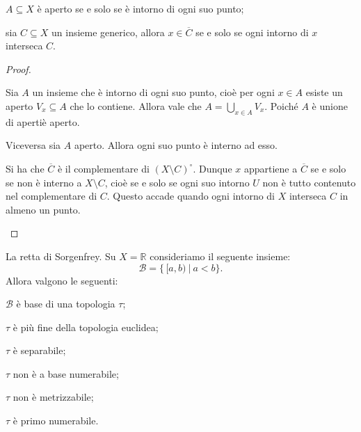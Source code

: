 \begin{prop}
	\begin{nlist}
		\item $A \subseteq X$ è aperto se e solo se è intorno di ogni suo punto;
		\item sia $C \subseteq X$ un insieme generico, allora $x \in
		\overline{C}$ se e solo se ogni intorno di $x$ interseca $C$.
	\end{nlist}
\end{prop}

\begin{proof}
    \begin{nlist}
        \item Sia $A$ un insieme che \`e intorno di ogni suo punto, cio\`e per
        ogni $x \in A$ esiste un aperto $V_x \subseteq A$ che lo contiene.
        Allora vale che $\displaystyle A = \bigcup_{x \in A} V_x$. Poiché $A$
        \`e unione di aperti\`e aperto.

        Viceversa sia $A$ aperto. Allora ogni suo punto \`e interno ad esso.

        \item Si ha che $\overline{C}$ \`e il complementare di $(X\setminus
        C)^\circ$. Dunque $x$ appartiene a $\overline{C}$ se e solo se non \`e
        interno a $X \setminus C$, cioè se e solo se ogni suo intorno $U$ non
        \`e tutto contenuto nel complementare di $C$. Questo accade quando ogni
        intorno di $X$ interseca $C$ in almeno un punto.
    \end{nlist}
\end{proof}

\begin{ex} \label{Sorgenfrey-retta}
	La retta di Sorgenfrey. Su $X=\mathbb{R}$ consideriamo il seguente insieme:
	$${\mathcal{B}=\{\,[a, b)\ |\ a<b\}}.$$
    Allora valgono le seguenti:
	\begin{nlist}
		\item $\mathcal{B}$ è base di una topologia $\tau$;
		\item $\tau$ \`e pi\`u fine della topologia euclidea;
		\item $\tau$ è separabile;
		\item $\tau$ non è a base numerabile;
		\item $\tau$ non è metrizzabile;
		\item $\tau$ è primo numerabile.
	\end{nlist}
\end{ex}

